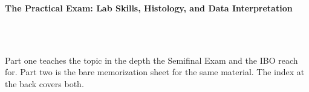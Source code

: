 



\makeindex[title={Index of This Volume},columns=2,intoc]

\begin{titlepage}\thispagestyle{empty}
\vspace*{0.14\textheight}
\noindent{\color{tierbeyond}\rule{\textwidth}{5pt}}\\[3pt]
\noindent{\color{bioline}\rule{\textwidth}{1pt}}\\[26pt]
\\[12pt]
\noindent\begin{minipage}{\textwidth}\raggedright
{\sffamily\bfseries\fontsize{28}{32}\selectfont\color{bioink}%
 \hyphenchar{} The Practical Exam: Lab Skills, Histology, and Data Interpretation\par}\end{minipage}\\[16pt]
\noindent{\color{biogreen}\rule{\textwidth}{1.4pt}}\\[10pt]
\noindent\begin{minipage}{\textwidth}\raggedright
{\fontsize{10.5}{14}\selectfont\color{biogreen}%
Part one teaches the topic in the depth the Semifinal Exam and the IBO reach for. Part two is the
bare memorization sheet for the same material. The index at the back covers both.\par}\end{minipage}
\vfill
\noindent{\color{bioline}\rule{\textwidth}{1pt}}\\[3pt]
\noindent{\color{tierbeyond}\rule{\textwidth}{5pt}}
\end{titlepage}
\tableofcontents
\clearpage
{}
\clearpage
\printindex


